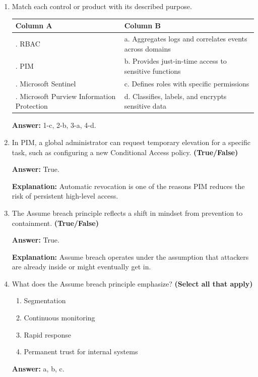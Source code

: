 \documentclass[10pt]{article}
\begin{document}
\begin{enumerate}[leftmargin=*]
\textbf{Explanation:} Password Administrator as an example of a narrowly defined role that avoids privilege creep.

\item Match each control or product with its described purpose.

\begin{center}
\begin{tabular}{>{\raggedright\arraybackslash}p{} >{\raggedright\arraybackslash}p{}}
\toprule
\textbf{Column A} & \textbf{Column B} \\
\midrule
1. RBAC & a. Aggregates logs and correlates events across domains \\
2. PIM & b. Provides just-in-time access to sensitive functions \\
3. Microsoft Sentinel & c. Defines roles with specific permissions \\
4. Microsoft Purview Information Protection & d. Classifies, labels, and encrypts sensitive data \\
\bottomrule
\end{tabular}
\end{center}

\textbf{Answer:} 1-c, 2-b, 3-a, 4-d.

\item In PIM, a global administrator can request temporary elevation for a specific task, such as configuring a new Conditional Access policy. \textbf{(True/False)}

\textbf{Answer:} True.

\textbf{Explanation:} Automatic revocation is one of the reasons PIM reduces the risk of persistent high-level access.

\item The Assume breach principle reflects a shift in mindset from prevention to containment. \textbf{(True/False)}

\textbf{Answer:} True.

\textbf{Explanation:} Assume breach operates under the assumption that attackers are already inside or might eventually get in.

\item What does the Assume breach principle emphasize? \textbf{(Select all that apply)}
\begin{enumerate}[label=\alph*., leftmargin=1.5em]
\item Segmentation
\item Continuous monitoring
\item Rapid response
\item Permanent trust for internal systems
\end{enumerate}
\textbf{Answer:} a, b, c.


\end{enumerate}
\end{document}
